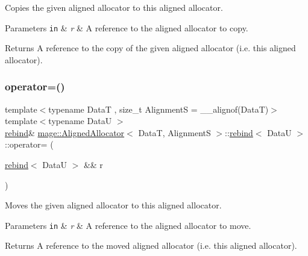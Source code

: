 Copies the given aligned allocator to this aligned allocator.


\begin{DoxyParams}[1]{Parameters}
\mbox{\tt in}  & {\em r} & A reference to the aligned allocator to copy. \\
\hline
\end{DoxyParams}
\begin{DoxyReturn}{Returns}
A reference to the copy of the given aligned allocator (i.\+e. this aligned allocator). 
\end{DoxyReturn}
\hypertarget{structmage_1_1_aligned_allocator_1_1rebind_a79fa8e41d87f7560eb74aaec7eecb191}{}\label{structmage_1_1_aligned_allocator_1_1rebind_a79fa8e41d87f7560eb74aaec7eecb191} 
\subsubsection{\texorpdfstring{operator=()}{operator=()}\hspace{0.1cm}{\footnotesize\ttfamily [2/2]}}
{\footnotesize\ttfamily template$<$typename DataT , size\+\_\+t AlignmentS = \+\_\+\+\_\+alignof(\+Data\+T)$>$ \\
template$<$typename DataU $>$ \\
\hyperlink{structmage_1_1_aligned_allocator_1_1rebind}{rebind}\& \hyperlink{structmage_1_1_aligned_allocator}{mage\+::\+Aligned\+Allocator}$<$ DataT, AlignmentS $>$\+::\hyperlink{structmage_1_1_aligned_allocator_1_1rebind}{rebind}$<$ DataU $>$\+::operator= (\begin{DoxyParamCaption}\item[{\hyperlink{structmage_1_1_aligned_allocator_1_1rebind}{rebind}$<$ DataU $>$ \&\&}]{r }\end{DoxyParamCaption})\hspace{0.3cm}{\ttfamily [delete]}}

Moves the given aligned allocator to this aligned allocator.


\begin{DoxyParams}[1]{Parameters}
\mbox{\tt in}  & {\em r} & A reference to the aligned allocator to move. \\
\hline
\end{DoxyParams}
\begin{DoxyReturn}{Returns}
A reference to the moved aligned allocator (i.\+e. this aligned allocator). 
\end{DoxyReturn}
